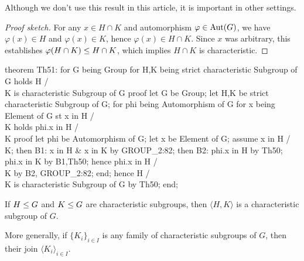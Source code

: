 \begin{thm-remark}
Although we don't use this result in this article, it is important in
other settings.
\end{thm-remark}

\begin{proof}[Proof sketch]
For any $x\in H\cap K$ and automorphism $\varphi\in\operatorname{Aut}(G)$, we have
$\varphi(x)\in H$ and $\varphi(x)\in K$, hence $\varphi(x)\in H\cap K$.
Since $x$ was arbitrary, this establishes $\varphi(H\cap K)\leq H\cap K$,
which implies $H\cap K$ is characteristic.
\end{proof}

\nwenddocs{}\endmoddef\nwstartdeflinemarkup{}\nwenddeflinemarkup
theorem Th51:
  for G being Group
  for H,K being strict characteristic Subgroup of G
  holds H /\\ K is characteristic Subgroup of G
proof
  let G be Group;
  let H,K be strict characteristic Subgroup of G;
  for phi being Automorphism of G
  for x being Element of G st x in H /\\ K
  holds phi.x in H /\\ K
  proof
    let phi be Automorphism of G;
    let x be Element of G;
    assume x in H /\\ K;
    then B1: x in H & x in K by GROUP_2:82;
    then B2: phi.x in H by Th50;
    phi.x in K by B1,Th50;
    hence phi.x in H /\\ K by B2, GROUP_2:82;
  end;
  hence H /\\ K is characteristic Subgroup of G by Th50;
end;
\eatline
{}\nwendcode{}\nwdocspar
\begin{theorem}
  If $H\leq G$ and $K\leq G$ are characteristic subgroups,
  then $\langle H, K\rangle$ is a characteristic subgroup of $G$.
\end{theorem}

\begin{thm-remark}
More generally, if $\{K_{i}\}_{i\in I}$ is any family of characteristic subgroups
of $G$, then their join $\langle K_{i}\rangle_{i\in I}$.
\end{thm-remark}

